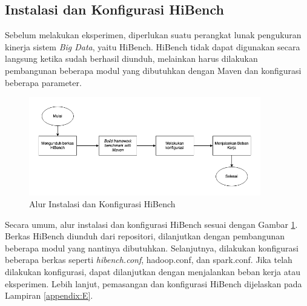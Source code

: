 \subsection{Instalasi dan Konfigurasi HiBench}
Sebelum melakukan eksperimen, diperlukan suatu perangkat lunak pengukuran kinerja sistem \textit{Big Data}, yaitu HiBench. HiBench tidak dapat digunakan secara langsung ketika sudah berhasil diunduh, melainkan harus dilakukan pembangunan beberapa modul yang dibutuhkan dengan Maven dan konfigurasi beberapa parameter. 

\begin{figure}[h]
    \centering
    \includegraphics[width=0.9\textwidth]{figures/ch03/hibench-flow.png}
    \caption{Alur Instalasi dan Konfigurasi HiBench}
    \label{fig:hibench-flow}
\end{figure}

Secara umum, alur instalasi dan konfigurasi HiBench sesuai dengan Gambar \ref{fig:hibench-flow}. Berkas HiBench diunduh dari repositori, dilanjutkan dengan pembangunan beberapa modul yang nantinya dibutuhkan. Selanjutnya, dilakukan konfigurasi beberapa berkas seperti \textit{hibench.conf}, hadoop.conf, dan spark.conf. Jika telah dilakukan konfigurasi, dapat dilanjutkan dengan menjalankan beban kerja atau eksperimen. Lebih lanjut, pemasangan dan konfigurasi HiBench dijelaskan pada Lampiran \ref{appendix:E}.



